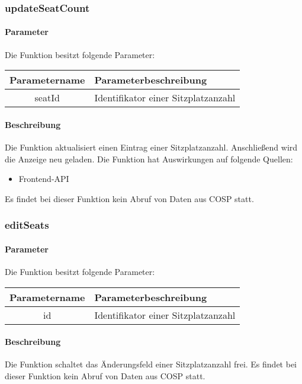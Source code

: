 \subsubsection{updateSeatCount}
\paragraph{Parameter} Die Funktion besitzt folgende Parameter:
\begin{table}[H]
	\begin{tabular}{|c|p{11cm}|}
		\hline
		\textbf{Parametername} & \textbf{Parameterbeschreibung} \\ \hline
		seatId & Identifikator einer Sitzplatzanzahl \\ \hline
	\end{tabular}
\end{table}
\paragraph{Beschreibung} Die Funktion aktualisiert einen Eintrag einer Sitzplatzanzahl. Anschließend wird die Anzeige neu geladen. Die Funktion hat Auswirkungen auf folgende Quellen:
\begin{itemize}
	\item Frontend-API
\end{itemize}
Es findet bei dieser Funktion kein Abruf von Daten aus {\glqq COSP\grqq} statt.
\subsubsection{editSeats}
\paragraph{Parameter} Die Funktion besitzt folgende Parameter:
\begin{table}[H]
	\begin{tabular}{|c|p{11cm}|}
		\hline
		\textbf{Parametername} & \textbf{Parameterbeschreibung} \\ \hline
		id & Identifikator einer Sitzplatzanzahl \\ \hline
	\end{tabular}
\end{table}
\paragraph{Beschreibung} Die Funktion schaltet das Änderungsfeld einer Sitzplatzanzahl frei. Es findet bei dieser Funktion kein Abruf von Daten aus {\glqq COSP\grqq} statt.
